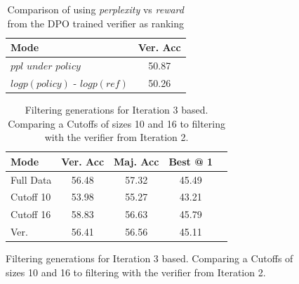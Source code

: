 \begin{figure}[ht]
\begin{table}[t]
\caption{Comparison of using \textit{perplexity} vs \textit{reward} from the DPO trained verifier as ranking}
\label{sample-table}
\vskip 0.15in
\begin{center}
\begin{small}
\begin{sc}
\begin{tabular}{lc}
\toprule
Mode & Ver. Acc \\
\midrule
$ppl \textit{ under policy}$  & 50.87 \\
$logp(\textit{policy})$ - $logp(\textit{ref})$ & 50.26\\
\bottomrule
\end{tabular}
\end{sc}
\end{small}
\end{center}
\vskip -0.1in
\end{table}


\begin{table}[t]
\caption{Filtering generations for Iteration 3 based. Comparing a Cutoffs of sizes 10 and 16 to filtering with the verifier from Iteration 2.}
\label{sample-table}
\vskip 0.15in
\begin{center}
\begin{small}
\begin{sc}
\begin{tabular}{lcccr}
\toprule
Mode & Ver. Acc & Maj. Acc & Best @ 1 \\
\midrule
Full Data  & 56.48 & 57.32 & 45.49 \\
\midrule
Cutoff 10  & 53.98 & 55.27 & 43.21\\
Cutoff 16 & 58.83 & 56.63 & 45.79 \\
\midrule
Ver.  & 56.41 & 56.56 & 45.11 \\
\bottomrule
\end{tabular}
\end{sc}
\end{small}
\end{center}
\vskip -0.1in
\end{table}




\end{figure}
